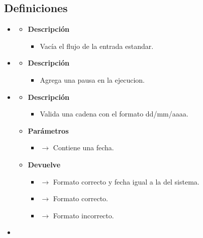 \subsection{Definiciones}
\begin{itemize}
     \item {}
    \begin{itemize}
        \item \textbf{Descripción}
        \begin{itemize}
			\item Vacía el flujo de la entrada estandar.
		\end{itemize}
	\end{itemize}
    \item {}
   \begin{itemize}
       \item \textbf{Descripción}
       \begin{itemize}
           \item Agrega una pausa en la ejecucion.
       \end{itemize}
   \end{itemize}
   \newpage
   \item {}
    \begin{itemize}
        \item \textbf{Descripción}
        \begin{itemize}
			\item Valida una cadena con el formato dd/mm/aaaa.
		\end{itemize}
		\item \textbf{Parámetros}
		\begin{itemize}
			\item {} $\rightarrow$ Contiene una fecha.
		\end{itemize}
        \item \textbf{Devuelve}
		\begin{itemize}
			\item {} $\rightarrow$ Formato correcto y fecha igual a la del sistema.
            \item {} $\rightarrow$ Formato correcto.
            \item {} $\rightarrow$ Formato incorrecto.
		\end{itemize}
	\end{itemize}
    \item {}
     \begin{itemize}

\end{itemize}
\end{itemize}
